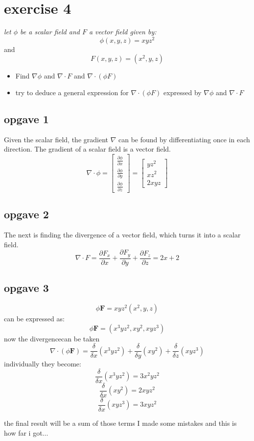 \section{exercise 4}
\textit{let $\phi$ be a scalar field and $F$ a vector field given by:}
\[\phi(x,y,z) = xyz^2\] and \[F(x,y,z) = (x^2,y,z)\]

\begin{itemize}
    \item Find $\nabla\phi$ and $\nabla \cdot F$ and $\nabla \cdot (\phi F)$
    \item try to deduce a general expression for $\nabla \cdot (\phi F)$ expressed by $\nabla \phi$ and $\nabla \cdot F$
\end{itemize}

\subsection{opgave 1}
Given the scalar field, the gradient $\nabla$ can be found by differentiating 
once in each direction. The gradient of a scalar field is a vector field.
\[
\nabla \cdot \phi = 
\begin{bmatrix}
\frac{\partial \phi}{\partial x}\\
\frac{\partial \phi}{\partial y}\\
\frac{\partial \phi}{\partial z}
\end{bmatrix}
=
\begin{bmatrix}
{yz^2}\\
{xz^2}\\
{2xyz}
\end{bmatrix}
\]
\subsection{opgave 2}
The next is finding the divergence of a vector field, which turns it into a scalar field.
\[
\nabla \cdot F = 
\frac{\partial F_x}{\partial x} 
+ \frac{\partial F_y}{\partial y} 
+ \frac{\partial F_z}{\partial z}
= 2x + 2
\]
\subsection{opgave 3}
\[\phi \textbf{F} = xyz^2(x^2,y,z)\]
can be expressed as:
\[ \phi \textbf{F} = (x^3yz^2, xy^2, xyz^3)\]
now the divergencecan be taken
\[\nabla \cdot (\phi \textbf{F}) = \frac{\delta}{\delta x}(x^3yz^2)+ \frac{\delta}{\delta y}(xy^2)+\frac{\delta }{\delta z}(xyz^3)\]
individually they become:
\[\frac{\delta}{\delta x}(x^3yz^2) =3x^2yz^2\]
\[\frac{\delta}{\delta x}(xy^2) = 2xyz^2\]
\[\frac{\delta}{\delta x}(xyz^3) = 3xyz^2\]

the final result will be a sum of those terms
I made some mistakes and this is how far i got...